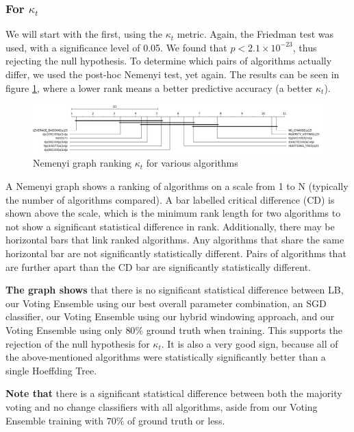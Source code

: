 \subsubsection{For $\kappa_t$}

We will start with the first, using the $\kappa_t$ metric. Again, the Friedman test was used, with a significance level of 0.05. We found that $p < 2.1\times10^{-23}$, thus rejecting the null hypothesis.
To determine which pairs of algorithms actually differ, we used the post-hoc Nemenyi test, yet again. The results can be seen in figure \ref{fig:sota_compare_all_kappa_nemenyi}, where a lower rank means a better predictive accuracy (a better $\kappa_t$).

\begin{figure}
  \includegraphics[width=\linewidth]{./images/chapter5/sota_compare_all_kappa_nemenyi}
\caption{\label{fig:sota_compare_all_kappa_nemenyi}Nemenyi graph ranking $\kappa_t$ for various algorithms}
\end{figure}

A Nemenyi graph shows a ranking of algorithms on a scale from 1 to N (typically the number of algorithms compared). A bar labelled critical difference (CD) is shown above the scale, which is the minimum rank length for two algorithms to not show a significant statistical difference in rank. 
Additionally, there may be horizontal bars that link ranked algorithms. Any algorithms that share the same horizontal bar are not significantly statistically different. Pairs of algorithms that are further apart than the CD bar are significantly statistically different.

\textbf{The graph shows} that there is no significant statistical difference between LB, our Voting Ensemble using our best overall parameter combination, an SGD classifier, our Voting Ensemble using our hybrid windowing approach, and our Voting Ensemble using only $80\%$ ground truth when training. This supports the rejection of the null hypothesis for $\kappa_t$. It is also a very good sign, because all of the above-mentioned algorithms were statistically significantly better than a single Hoeffding Tree.

\textbf{Note that} there is a significant statistical difference between both the majority voting and no change classifiers with all algorithms, aside from our Voting Ensemble training with $70\%$ of ground truth or less.

